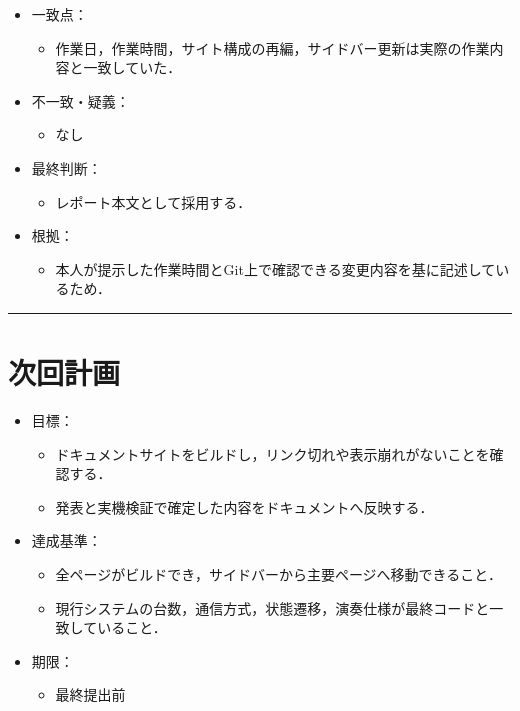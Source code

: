 \documentclass[uplatex,dvipdfmx,a4paper,11pt]{jsarticle}
\newcommand{\sectionrule}{\par\medskip\noindent\rule{\linewidth}{0.6pt}\par\medskip}
\begin{document}
\begin{itemize}
  \item 一致点：
    \begin{itemize}
      \item 作業日，作業時間，サイト構成の再編，サイドバー更新は実際の作業内容と一致していた．
    \end{itemize}
  \item 不一致・疑義：
    \begin{itemize}
      \item なし
    \end{itemize}
  \item 最終判断：
    \begin{itemize}
      \item レポート本文として採用する．
    \end{itemize}
  \item 根拠：
    \begin{itemize}
      \item 本人が提示した作業時間とGit上で確認できる変更内容を基に記述しているため．
    \end{itemize}
\end{itemize}

\sectionrule

\section{次回計画}

\begin{itemize}
  \item 目標：
    \begin{itemize}
      \item ドキュメントサイトをビルドし，リンク切れや表示崩れがないことを確認する．
      \item 発表と実機検証で確定した内容をドキュメントへ反映する．
    \end{itemize}
  \item 達成基準：
    \begin{itemize}
      \item 全ページがビルドでき，サイドバーから主要ページへ移動できること．
      \item 現行システムの台数，通信方式，状態遷移，演奏仕様が最終コードと一致していること．
    \end{itemize}
  \item 期限：
    \begin{itemize}
      \item 最終提出前
    \end{itemize}
\end{itemize}
\end{document}
